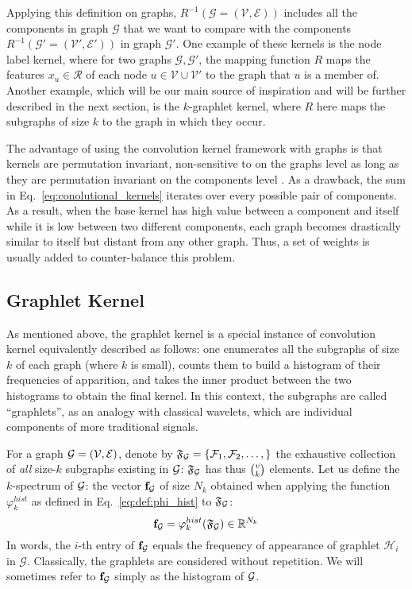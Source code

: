 Applying this definition on graphs, $R^{-1}(\mathcal{G}=(\mathcal{V},\mathcal{E}))$ includes all the components in graph $\mathcal{G}$  that we want to compare with the components $R^{-1}(\mathcal{G'}=(\mathcal{V}',\mathcal{E}'))$ in graph $\mathcal{G'}$. One example of these kernels is the node label kernel, where for two graphs $\mathcal{G}, \mathcal{G'}$, the mapping function $R$ maps the features $x_u\in \mathcal{R}$ of each node $u\in \mathcal{V}\cup \mathcal{V'}$ to the graph that $u$ is a member of.  Another example, which will be our main source of inspiration and will be further described in the next section, is the $k$-graphlet kernel, where $R$ here maps the subgraphs of size $k$ to the graph in which they occur.

The advantage of using the convolution kernel framework with graphs is that kernels are permutation invariant, non-sensitive to  on the graphs level as long as they are permutation invariant on the components level . As a drawback, the sum in Eq.~\ref{eq:conolutional_kernels} iterates over every possible pair of components. As a result, when the base kernel has high value between a component and itself while it is low between two different components, each graph becomes drastically similar to itself but distant from any other graph. Thus, a set of weights is usually added to counter-balance this problem.

\subsection{Graphlet Kernel}
\label{subsection: graphlet kernel}

As mentioned above, the graphlet kernel is a special instance of convolution kernel equivalently described as follows: one enumerates all the subgraphs of size $k$ of each graph (where $k$ is small), counts them to build a histogram of their frequencies of apparition, and takes the inner product between the two histograms to obtain the final kernel. In this context, the subgraphs are called ``graphlets'', as an analogy with classical wavelets, which are individual components of more traditional signals.

For a graph $\mathcal{G}=(\mathcal{V},\mathcal{E})$, denote by $\mathfrak{F}_{\mathcal{G}}=\{\mathcal{F}_1,\mathcal{F}_2,\ldots,\}$ the exhaustive collection of \emph{all} size-$k$ subgraphs existing in $\mathcal{G}$: $\mathfrak{F}_{\mathcal{G}}$ has thus  $\tbinom{v}{k}$ elements. Let us define the $k$-spectrum of $\mathcal{G}$: the vector $\mathbf{f}_{\mathcal{G}}$ of size $N_k$ obtained when applying the function $\varphi_k^{hist}$ as defined in Eq.~\eqref{eq:def:phi_hist} to  $\mathfrak{F}_{\mathcal{G}}$:
\[
\mathbf{f}_{\mathcal{G}}=\varphi_k^{hist}(\mathfrak{F}_{\mathcal{G}}) \in\mathbb{R}^{N_k}
\]
In words, the $i$-th entry of $\mathbf{f}_{\mathcal{G}}$ equals the frequency of appearance of graphlet $\mathcal{H}_i$ in $\mathcal{G}$. Classically, the graphlets are considered without repetition. We will sometimes refer to $\mathbf{f}_{\mathcal{G}}$ simply as the histogram of $\mathcal{G}$. 

